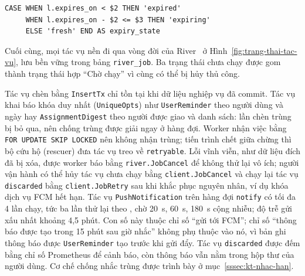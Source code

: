 \begin{Verbatim}
CASE WHEN l.expires_on < $2 THEN 'expired'
     WHEN l.expires_on - $2 <= $3 THEN 'expiring'
     ELSE 'fresh' END AS expiry_state
\end{Verbatim}

Cuối cùng, mọi tác vụ nền đi qua vòng đời của River~\cite{river} ở Hình~\ref{fig:trang-thai-tac-vu}, lưu bền vững trong bảng \texttt{river\_job}. Ba trạng thái chưa chạy được gom thành trạng thái hợp “Chờ chạy” vì cùng có thể bị hủy thủ công.


Tác vụ chèn bằng \texttt{InsertTx} chỉ tồn tại khi dữ liệu nghiệp vụ đã commit. Tác vụ khai báo khóa duy nhất (\texttt{UniqueOpts}) như \texttt{UserReminder} theo người dùng và ngày hay \texttt{AssignmentDigest} theo người được giao và danh sách: lần chèn trùng bị bỏ qua, nên chống trùng được giải ngay ở hàng đợi. Worker nhận việc bằng \texttt{FOR UPDATE SKIP LOCKED} nên không nhận trùng; tiến trình chết giữa chừng thì bộ cứu hộ (rescuer) đưa tác vụ treo về \texttt{retryable}. Lỗi vĩnh viễn, như dữ liệu đích đã bị xóa, được worker báo bằng \texttt{river.JobCancel} để không thử lại vô ích; người vận hành có thể hủy tác vụ chưa chạy bằng \texttt{client.JobCancel} và chạy lại tác vụ \texttt{discarded} bằng \texttt{client.JobRetry} sau khi khắc phục nguyên nhân, ví dụ khóa dịch vụ FCM hết hạn. Tác vụ \texttt{PushNotification} trên hàng đợi \texttt{notify} có tối đa 4 lần chạy, tức ba lần thử lại theo , chờ 20~s, 60~s, 180~s cộng nhiễu; độ trễ gửi xấu nhất khoảng 4,5 phút. Con số này thuộc chỉ số “gửi tới FCM”; chỉ số “thông báo được tạo trong 15 phút sau giờ nhắc” không phụ thuộc vào nó, vì bản ghi thông báo được \texttt{UserReminder} tạo trước khi gửi đẩy. Tác vụ \texttt{discarded} được đếm bằng chỉ số Prometheus để cảnh báo, còn thông báo vẫn nằm trong hộp thư của người dùng. Cơ chế chống nhắc trùng được trình bày ở mục~\ref{sssec:kt-nhac-han}.
